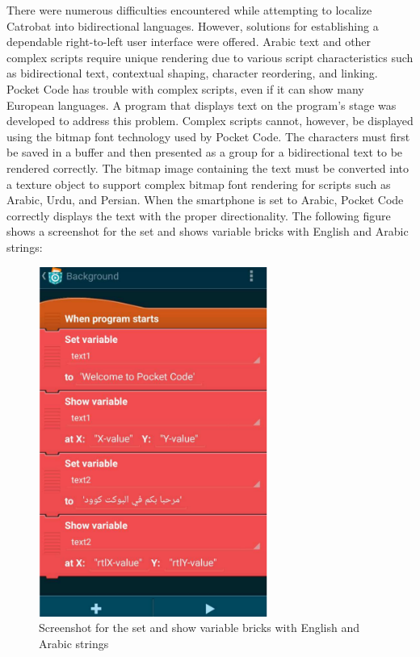 There were numerous difficulties encountered while attempting to localize Catrobat into bidirectional languages. However, solutions for establishing a dependable right-to-left user interface were offered. Arabic text and other complex scripts require unique rendering due to various script characteristics such as bidirectional text, contextual shaping, character reordering, and linking. Pocket Code has trouble with complex scripts, even if it can show many European languages. A program that displays text on the program's stage was developed to address this problem. Complex scripts cannot, however, be displayed using the bitmap font technology used by Pocket Code. The characters must first be saved in a buffer and then presented as a group for a bidirectional text to be rendered correctly. The bitmap image containing the text must be converted into a texture object to support complex bitmap font rendering for scripts such as Arabic, Urdu, and Persian. When the smartphone is set to Arabic, Pocket Code correctly displays the text with the proper directionality. The following figure shows a screenshot for the set and shows variable bricks with English and Arabic strings:

\begin{figure}[H]
\centering
\includegraphics[width=7.5cm]{ch2-images/catrobat2.png}
\caption{Screenshot for the set and show variable bricks with English and Arabic strings \cite{awwad2017localization}}
\label{fig:Screenshot for the set and show variable bricks with English and Arabic strings}
\end{figure} 

